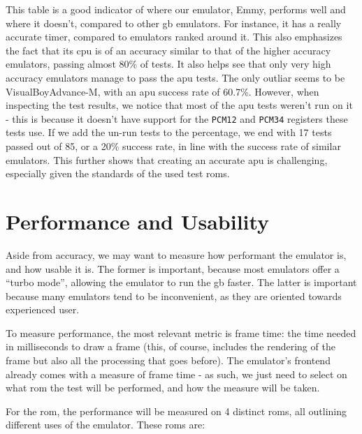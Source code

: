 \documentclass[11pt]{informatics-report}
\begin{document}
This table is a good indicator of where our emulator, Emmy, performs well and where it doesn't, compared to other \gls{gb} emulators. For instance, it has a really accurate timer, compared to emulators ranked around it. This also emphasizes the fact that its \gls{cpu} is of an accuracy similar to that of the higher accuracy emulators, passing almost 80\% of tests. It also helps see that only very high accuracy emulators manage to pass the \gls{apu} tests. The only outliar seems to be VisualBoyAdvance-M, with an \gls{apu} success rate of 60.7\%. However, when inspecting the test results, we notice that most of the \gls{apu} tests weren't run on it - this is because it doesn't have support for the \texttt{PCM12} and \texttt{PCM34} registers these tests use. If we add the un-run tests to the percentage, we end with 17 tests passed out of 85, or a 20\% success rate, in line with the success rate of similar emulators. This further shows that creating an accurate \gls{apu} is challenging, especially given the standards of the used test \glspl{rom}.

\section{Performance and Usability}

Aside from accuracy, we may want to measure how performant the emulator is, and how usable it is. The former is important, because most emulators offer a ``turbo mode'', allowing the emulator to run the \gls{gb} faster. The latter is important because many emulators tend to be inconvenient, as they are oriented towards experienced user.

To measure performance, the most relevant metric is frame time: the time needed in milliseconds to draw a frame (this, of course, includes the rendering of the frame but also all the processing that goes before). The emulator's frontend already comes with a measure of frame time - as such, we just need to select on what \gls{rom} the test will be performed, and how the measure will be taken.

For the \gls{rom}, the performance will be measured on 4 distinct \glspl{rom}, all outlining different uses of the emulator. These \glspl{rom} are:
\end{document}
